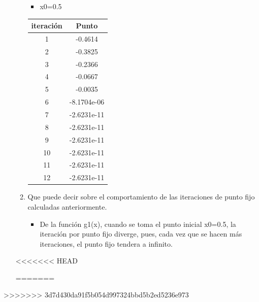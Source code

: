 \documentclass{udparticle}
\begin{document}
\begin{enumerate}
\begin{enumerate}
\begin{table}[H]
\begin{tabular} { |c|c|}
        \end{tabular}
        
    \end{table}
     \begin{itemize}
\item x0=0.5
\end{itemize}

\begin{table}[H]
    \centering
        \begin{tabular} { |c|c|}
        
        \hline
        iteración  &  Punto\\
        \hline
        1 &  -0.4614      \\
         \hline
        2 &   -0.3825   \\
         \hline
        3 &  -0.2366 \\
         \hline
        4 &  -0.0667    \\
         \hline
        5 &   -0.0035 \\
         \hline
        6 & -8.1704e-06     \\
         \hline
        7 &     -2.6231e-11 \\
         \hline
        8 &   -2.6231e-11   \\
         \hline
        9 &        -2.6231e-11 \\
         \hline
        10 &     -2.6231e-11    \\
         \hline
        11 &    -2.6231e-11 \\
         \hline
        12 &    -2.6231e-11  \\
        \hline
        
        \end{tabular}
        
    \end{table}
\vspace{3cm}
\item Que puede decir sobre el comportamiento de las iteraciones de punto fijo calculadas anteriormente.
\begin{itemize}

\item De la función g1(x), cuando se toma el punto inicial x0=0.5, la iteración por punto fijo diverge, pues, cada vez que se hacen más iteraciones, el punto fijo tendera a infinito. 
\end{itemize}
\end{enumerate}
<<<<<<< HEAD

=======
\end{enumerate}
>>>>>>> 3d7d430da91f5b054d997324bbd5b2ed5236e973
\end{document}
